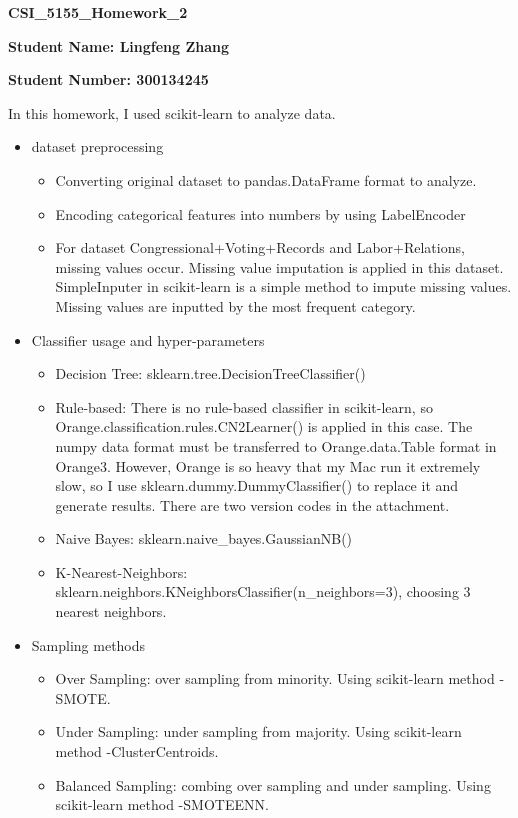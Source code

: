 \documentclass{article}
\begin{document}
\begin{center}
    \textbf{\huge{CSI\_5155\_Homework\_2}}
\end{center}

\textbf{Student Name: Lingfeng Zhang}

\textbf{Student Number: 300134245}

In this homework, I used scikit-learn to analyze data.

\begin{itemize}

\item dataset preprocessing

\begin{itemize}
    \item Converting original dataset to pandas.DataFrame format to analyze.
    \item Encoding categorical features into numbers by using LabelEncoder
    \item For dataset Congressional+Voting+Records and Labor+Relations, missing values occur. Missing value imputation is applied in this dataset. SimpleInputer in scikit-learn is a simple method to impute missing values. Missing values are inputted by the most frequent category. 
\end{itemize}

\item Classifier usage and hyper-parameters

\begin{itemize}
    \item Decision Tree: sklearn.tree.DecisionTreeClassifier()
    \item Rule-based: There is no rule-based classifier in scikit-learn, so Orange.classification.rules.CN2Learner() is applied in this case. The numpy data format must be transferred to Orange.data.Table format in Orange3. However, Orange is so heavy that my Mac run it extremely slow, so I use sklearn.dummy.DummyClassifier() to replace it and generate results. There are two version codes in the attachment. 
    \item Naive Bayes: sklearn.naive\_bayes.GaussianNB()
    \item K-Nearest-Neighbors: sklearn.neighbors.KNeighborsClassifier(n\_neighbors=3), choosing 3 nearest neighbors.
\end{itemize}

\item Sampling methods

\begin{itemize}
    \item Over Sampling: over sampling from minority. Using scikit-learn method -SMOTE.
    \item Under Sampling: under sampling from majority. Using scikit-learn method -ClusterCentroids.
    \item Balanced Sampling: combing over sampling and under sampling. Using scikit-learn method -SMOTEENN.
\end{itemize}


\end{itemize}
\end{document}
